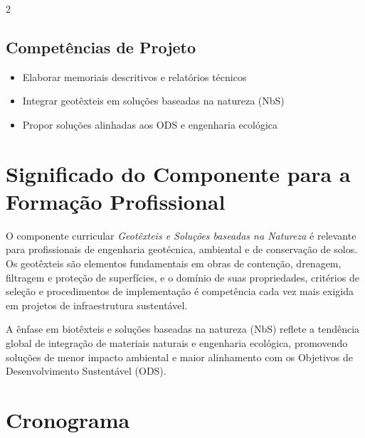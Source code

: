 \documentclass[11pt,a4paper]{article}
\begin{document}
\begin{multicols}{2}
\begin{itemize}
\end{itemize}

\subsection*{Competências de Projeto}

\begin{itemize}

\item Elaborar memoriais descritivos e relatórios técnicos

\item Integrar geotêxteis em soluções baseadas na natureza (NbS)

\item Propor soluções alinhadas aos ODS e engenharia ecológica

\end{itemize}

\end{multicols}

\section*{Significado do Componente para a Formação Profissional}

O componente curricular \textit{Geotêxteis e Soluções baseadas na Natureza} é relevante para profissionais de engenharia geotécnica, ambiental e de conservação de solos. Os geotêxteis são elementos fundamentais em obras de contenção, drenagem, filtragem e proteção de superfícies, e o domínio de suas propriedades, critérios de seleção e procedimentos de implementação é competência cada vez mais exigida em projetos de infraestrutura sustentável.

A ênfase em biotêxteis e soluções baseadas na natureza (NbS) reflete a tendência global de integração de materiais naturais e engenharia ecológica, promovendo soluções de menor impacto ambiental e maior alinhamento com os Objetivos de Desenvolvimento Sustentável (ODS).

\section*{Cronograma}
\end{document}
